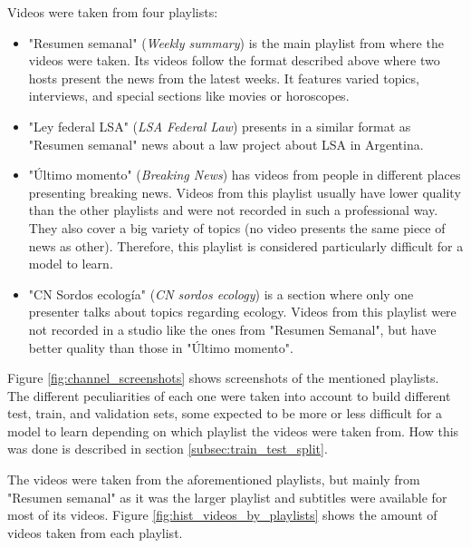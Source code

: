 Videos were taken from four playlists:

\begin{itemize}
    
    \item "Resumen semanal" (\textit{Weekly summary}) is the main playlist from where the videos were taken. Its videos follow the format described above where two hosts present the news from the latest weeks. It features varied topics, interviews, and special sections like movies or horoscopes.
    
    \item "Ley federal LSA" (\textit{LSA Federal Law}) presents in a similar format as "Resumen semanal" news about a law project about LSA in Argentina.
    
    \item "Último momento" (\textit{Breaking News}) has videos from people in different places presenting breaking news. Videos from this playlist usually have lower quality than the other playlists and were not recorded in such a professional way. They also cover a big variety of topics (no video presents the same piece of news as other). Therefore, this playlist is considered particularly difficult for a model to learn.
    
    \item "CN Sordos ecología" (\textit{CN sordos ecology}) is a section where only one presenter talks about topics regarding ecology. Videos from this playlist were not recorded in a studio like the ones from "Resumen Semanal", but have better quality than those in "Último momento".
    
\end{itemize}

Figure \ref{fig:channel_screenshots} shows screenshots of the mentioned playlists. The different peculiarities of each one were taken into account to build different test, train, and validation sets, some expected to be more or less difficult for a model to learn depending on which playlist the videos were taken from. How this was done is described in section \ref{subsec:train_test_split}.

The videos were taken from the aforementioned playlists, but mainly from "Resumen semanal" as it was the larger playlist and subtitles were available for most of its videos. Figure \ref{fig:hist_videos_by_playlists} shows the amount of videos taken from each playlist.


